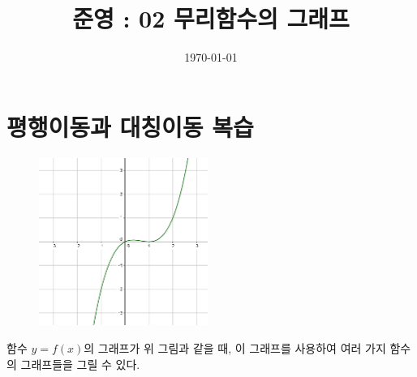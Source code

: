 \documentclass{article}
\begin{document}
\title{준영 : 02 무리함수의 그래프}
\author{}
\date{\today}
\maketitle
\tableofcontents
\newpage

\section{평행이동과 대칭이동 복습}

\begin{figure}[h!]
\centering
\includegraphics[width=0.49\textwidth]{review_1_1}
\end{figure}

함수 \(y=f(x)\)의 그래프가 위 그림과 같을 때, 이 그래프를 사용하여 여러 가지 함수의 그래프들을 그릴 수 있다.
\end{document}
